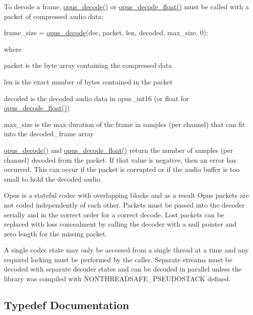 To decode a frame, \hyperlink{group__opus__decoder_ga7d1111f64c36027ddcb81799df9b3fc9}{opus\+\_\+decode()} or \hyperlink{group__opus__decoder_ga9c554b8c0214e24733a299fe53bb3bd2}{opus\+\_\+decode\+\_\+float()} must be called with a packet of compressed audio data\+: 
\begin{DoxyCode}
frame\_size = \hyperlink{group__opus__decoder_ga7d1111f64c36027ddcb81799df9b3fc9}{opus\_decode}(dec, packet, len, decoded, max\_size, 0);
\end{DoxyCode}
 where

\begin{DoxyItemize}
\item packet is the byte array containing the compressed data \item len is the exact number of bytes contained in the packet \item decoded is the decoded audio data in opus\+\_\+int16 (or float for \hyperlink{group__opus__decoder_ga9c554b8c0214e24733a299fe53bb3bd2}{opus\+\_\+decode\+\_\+float()}) \item max\+\_\+size is the max duration of the frame in samples (per channel) that can fit into the decoded\+\_\+frame array\end{DoxyItemize}
\hyperlink{group__opus__decoder_ga7d1111f64c36027ddcb81799df9b3fc9}{opus\+\_\+decode()} and \hyperlink{group__opus__decoder_ga9c554b8c0214e24733a299fe53bb3bd2}{opus\+\_\+decode\+\_\+float()} return the number of samples (per channel) decoded from the packet. If that value is negative, then an error has occurred. This can occur if the packet is corrupted or if the audio buffer is too small to hold the decoded audio.

Opus is a stateful codec with overlapping blocks and as a result Opus packets are not coded independently of each other. Packets must be passed into the decoder serially and in the correct order for a correct decode. Lost packets can be replaced with loss concealment by calling the decoder with a null pointer and zero length for the missing packet.

A single codec state may only be accessed from a single thread at a time and any required locking must be performed by the caller. Separate streams must be decoded with separate decoder states and can be decoded in parallel unless the library was compiled with N\+O\+N\+T\+H\+R\+E\+A\+D\+S\+A\+F\+E\+\_\+\+P\+S\+E\+U\+D\+O\+S\+T\+A\+CK defined. 

\subsection{Typedef Documentation}
\mbox{\label{group__opus__decoder_ga401d8579958d36094715a6b90cd159a6}} 
